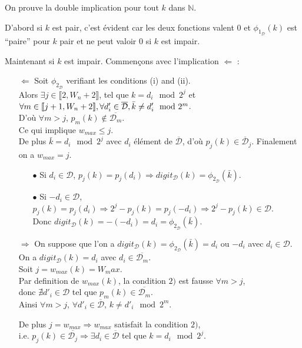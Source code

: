 \documentclass[12pt, a4paper]{memoir}
\begin{document}
\begin{Preuve}
 On prouve la double implication pour tout $k$ dans $\mathbb{N}$.
 
 D'abord si $k$ est pair, c'est évident car les deux fonctions valent $0$ et $\phi_{1_\mathcal{D}}(k)$ est ``paire'' pour $k$ pair et ne peut valoir $0$ si $k$ est impair.
 
 Maintenant si $k$ est impair. Commençons avec l'implication $\Leftarrow$ :
 \begin{itemize}
  \item [$\Leftarrow$] Soit $\phi_{2_\mathcal{D}}$ verifiant les conditions (i) and (ii). \\
  Alors $\exists j \in \llbracket 2,W_n+2 \rrbracket$,
 tel que $k = d_i \mod 2^j$ et $\forall m \in \llbracket j+1,W_n+2 \rrbracket, \\
 \forall d'_i \in \overline{\mathcal{D}}, \bar{k} \neq d'_i \mod 2^m$. \\
 D'où $\forall m > j$, $p_m(k) \notin \overline{\mathcal{D}_m}$. \\
 Ce qui implique $w_{max} \leq j$. \\
 De plus $\bar{k} = d_i \mod 2^j$ avec $d_i$ élément de $\overline{\mathcal{D}}$, d'où $p_j(k) \in \overline{\mathcal{D}}_j$.
 Finalement on a $w_{max} = j$.
  \begin{itemize}
   \item [$\bullet$] Si $d_i \in \mathcal{D}$,  $p_j(k)=p_j(d_i) \Rightarrow digit_{\mathcal{D}}(k) = \phi_{2_\mathcal{D}}(\bar{k})$.
   \item [$\bullet$] Si $-d_i \in \mathcal{D}$, $p_j(k)=p_j(d_i) \Rightarrow 2^j - p_j(k)=p_j(-d_i) \Rightarrow 2^j - p_j(k) \in \mathcal{D}$. \\
   Donc $digit_{\mathcal{D}}(k) =-(-d_i)=d_i=\phi_{2_\mathcal{D}}(\bar{k})$.
  \end{itemize}
  \item [$\Rightarrow$] On suppose que l'on a $digit_{\mathcal{D}}(k) = \phi_{2_\mathcal{D}}(\bar{k}) = d_i$ ou $-d_i$ avec $d_i \in \mathcal{D}$. \\
  On a $digit_{\mathcal{D}}(k) = d_i$ avec $d_i \in \overline{\mathcal{D}_m}$. \\
  Soit $j = w_{max}(k) = W_max$. \\
  Par definition de $w_{max}(k)$, la condition $2)$ est fausse $\forall m > j$, \\
  donc $\nexists d'_i \in \mathcal{D}$ tel que $p_m(k) \in \overline{\mathcal{D}_m}$. \\
  Ainsi $\forall m > j$, $\forall d'_i \in \overline{\mathcal{D}}$, $k \neq d'_i \mod 2^m$.
  
  De plus $j=w_{max} \Rightarrow w_{max}$ satisfait la condition $2)$, \\
  i.e. $p_j(k) \in \overline{\mathcal{D}_j} \Rightarrow \exists d_i \in \overline{\mathcal{D}}$ tel que $k = d_i \mod 2^j$.
 \end{itemize}

\end{Preuve}
\end{document}
